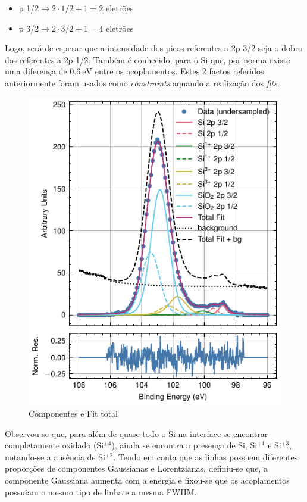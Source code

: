 \documentclass[baaa]{baaa}
\begin{document}
\begin{itemize}
  \item p 1/2$\longrightarrow 2\cdot 1/2 +1 = 2$ eletrões
  \item p 3/2$\longrightarrow 2\cdot 3/2 +1 = 4$ eletrões
\end{itemize}


Logo, será de esperar que a intensidade dos picos referentes a 2p 3/2 seja o dobro dos referentes a 2p 1/2. Também é conhecido, para o Si que, por norma existe uma diferença de $0.6\ \si{\electronvolt}$ entre os acoplamentos. Estes 2 factos referidos anteriormente foram usados como \textit{constraints} aquando a realização dos \textit{fits}.

\begin{figure}[t!]
  \centering
  \includegraphics[width=\columnwidth]{Figuras/fits.pdf}
  \caption{Componentes e Fit total}
  \label{fig:tot}
\end{figure}


Observou-se que, para além de quase todo o Si na interface se encontrar completamente oxidado (Si$^{+4}$), ainda se encontra a presença de Si, Si$^{+1}$ e Si$^{+3}$, notando-se a ausência de Si$^{+2}$. Tendo em conta que as linhas possuem diferentes proporções de componentes Gaussianas e Lorentzianas, definiu-se que, a componente Gaussiana aumenta com a energia e fixou-se que os acoplamentos possuiam o mesmo tipo de linha e a mesma FWHM.
\end{document}

